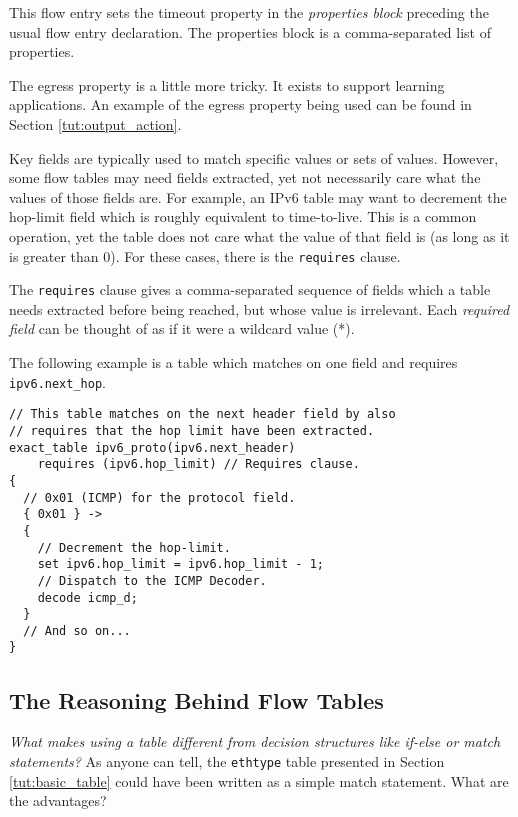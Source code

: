 This flow entry sets the timeout property in the \textit{properties block}
preceding the usual flow entry declaration. The properties block is a
comma-separated list of properties.

The egress property is a little more tricky. It exists to support learning applications. An example of the egress property being used can be found in Section \ref{tut:output_action}.

Key fields are typically used to match specific values or sets of values. However, some flow tables may need fields extracted, yet not
necessarily care what the values of those fields are. For example, an IPv6 table
may want to decrement the hop-limit field which is roughly equivalent to time-to-live. This is a common operation, yet the table
does not care what the value of that field is (as long as it is greater than 0).
For these cases, there is the \texttt{requires} clause.

The \texttt{requires} clause gives a comma-separated sequence of fields which a table needs
extracted before being reached, but whose value is irrelevant. Each
\textit{required field} can be thought of as if it were a wildcard value (*).

The following example is a table which matches on one field and requires
\texttt{ipv6.next\_hop}.

\begin{codepage}
\begin{lstlisting}
// This table matches on the next header field by also
// requires that the hop limit have been extracted.
exact_table ipv6_proto(ipv6.next_header)
	requires (ipv6.hop_limit) // Requires clause.
{
  // 0x01 (ICMP) for the protocol field.
  { 0x01 } ->
  {
  	// Decrement the hop-limit.
  	set ipv6.hop_limit = ipv6.hop_limit - 1; 
  	// Dispatch to the ICMP Decoder.
  	decode icmp_d;
  }
  // And so on...
}
\end{lstlisting}
\end{codepage}



\subsection{The Reasoning Behind Flow Tables} \label{tut:why_tables}

\textit{What makes using a table different from decision structures like
if-else or match statements?} As anyone can tell, the \texttt{ethtype} table
presented in Section \ref{tut:basic_table} could have been written as a simple
match statement. What are the advantages?

